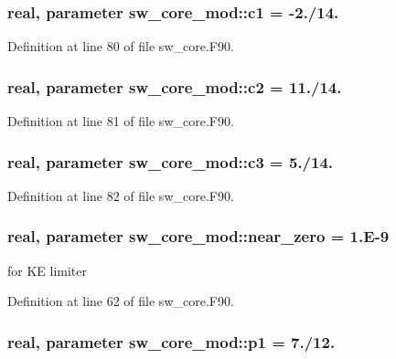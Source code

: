 \subsubsection[{c1}]{\setlength{\rightskip}{0pt plus 5cm}real, parameter sw\-\_\-core\-\_\-mod\-::c1 = -\/2./14.}\label{classsw__core__mod_aa07fe9004d87c794dfe3f7593c96275f}


Definition at line 80 of file sw\-\_\-core.\-F90.

\subsubsection[{c2}]{\setlength{\rightskip}{0pt plus 5cm}real, parameter sw\-\_\-core\-\_\-mod\-::c2 = 11./14.}\label{classsw__core__mod_a1be5c791573d2932b307ed6cdf52f2bc}


Definition at line 81 of file sw\-\_\-core.\-F90.

\subsubsection[{c3}]{\setlength{\rightskip}{0pt plus 5cm}real, parameter sw\-\_\-core\-\_\-mod\-::c3 = 5./14.}\label{classsw__core__mod_ae6bff2a81849c99f2258c7e7cea943b0}


Definition at line 82 of file sw\-\_\-core.\-F90.

\subsubsection[{near\-\_\-zero}]{\setlength{\rightskip}{0pt plus 5cm}real, parameter sw\-\_\-core\-\_\-mod\-::near\-\_\-zero = 1.E-\/9}\label{classsw__core__mod_a8bb76797403fecba5a8dc08930f838f0}


for K\-E limiter 



Definition at line 62 of file sw\-\_\-core.\-F90.

\subsubsection[{p1}]{\setlength{\rightskip}{0pt plus 5cm}real, parameter sw\-\_\-core\-\_\-mod\-::p1 = 7./12.}\label{classsw__core__mod_acd7311e0d77f5dd234d3456d70e0741e}


